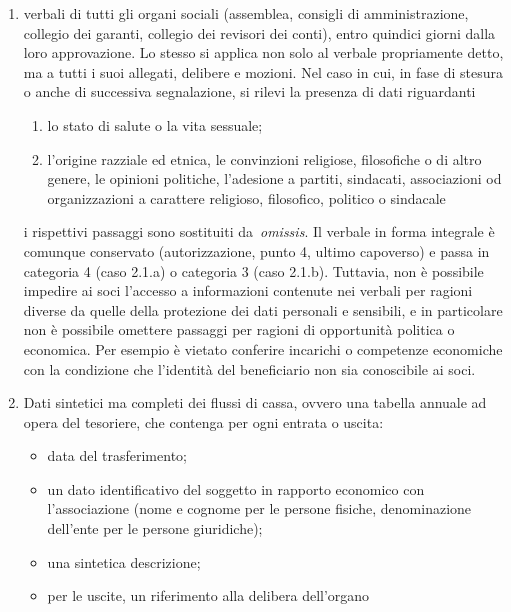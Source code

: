 \begin{enumerate}
    \item
        verbali di tutti gli organi sociali (assemblea, consigli di
        amministrazione, collegio dei garanti, collegio dei revisori dei
        conti), entro quindici giorni dalla loro approvazione. Lo stesso si
        applica non solo al verbale propriamente detto, ma a tutti i suoi
        allegati, delibere e mozioni. Nel caso in cui, in fase di stesura
        o anche di successiva segnalazione, si rilevi la presenza di dati
        riguardanti
        \begin{enumerate}
            \item lo stato di salute o la vita sessuale;
            \item l'origine razziale ed etnica, le
                convinzioni religiose, filosofiche o di altro genere, le opinioni
                politiche, l'adesione a partiti, sindacati, associazioni od
                organizzazioni a carattere religioso, filosofico, politico o
                sindacale
        \end{enumerate}
        i rispettivi passaggi sono sostituiti da~\emph{omissis}. Il verbale in
        forma integrale è comunque conservato (autorizzazione, punto 4, ultimo
        capoverso) e passa in categoria 4 (caso 2.1.a) o categoria 3 (caso
        2.1.b). Tuttavia, non è possibile impedire ai soci l'accesso a
        informazioni contenute nei verbali per ragioni diverse da quelle
        della protezione dei dati personali e sensibili, e in particolare non è
        possibile omettere passaggi per ragioni di opportunità politica o
        economica. Per esempio è vietato conferire incarichi o competenze
        economiche con la condizione che l'identità del beneficiario non sia
        conoscibile ai soci.
    \item
        Dati sintetici ma completi dei flussi di cassa, ovvero una tabella
        annuale ad opera del tesoriere, che contenga per ogni entrata o uscita:
        \begin{itemize}
            \item data del trasferimento;
            \item un dato identificativo del soggetto in rapporto economico
                con l'associazione (nome e cognome per le persone fisiche,
                denominazione dell'ente per le persone giuridiche);
            \item una sintetica descrizione;
            \item per le uscite, un riferimento alla delibera dell'organo

\end{itemize}
\end{enumerate}
